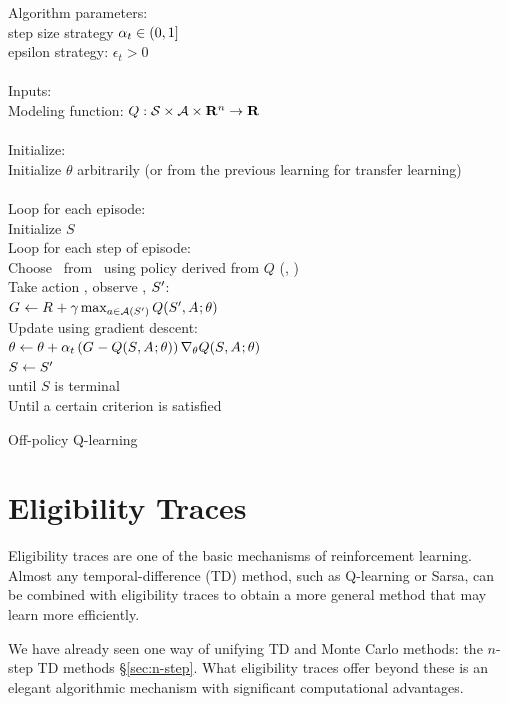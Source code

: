 \begin{table}
\beginalg
Algorithm parameters:\\
\> step size strategy $\alpha_{t} \in (0, 1]$\\
\> epsilon strategy: $\epsilon_t>0$\\
\\
Inputs:\\
\> Modeling function: $Q: \mathcal{S} \times \mathcal{A} \times \mathbf{R}^n \to \mathbf{R}$\\
\\
Initialize:\\
\> Initialize $\theta$ arbitrarily (or from the previous learning for transfer learning)\\
\\
Loop for each episode:\\
\> Initialize $S$\\
\> Loop for each step of episode:\\
\> \> Choose \action{}\ from \state{}\ using policy derived from $Q$ (\eg, \epsgreedy)\\
\> \> Take action \action{}, observe \reward{}, $S_{}'$:\\
\> \> \> $G_{{}} \leftarrow R_{} + \gamma \max_{a\in\mathcal{A}(S')}Q(S_{}',A_{}; \theta)$\\
\> \> Update using gradient descent:\\
\> \> \> $\theta \leftarrow  \theta + \alpha_{t} \left(G_{{}} - Q(S_{}, A_{}; \theta) \right) \nabla_\theta Q(S_{}, A_{}; \theta)$\\
\> \> $S \leftarrow S'$\\
\> until $S$ is terminal\\
Until a certain criterion is satisfied
\endalg
\caption{Off-policy Q-learning}
\label{tab:alg:fcn-approx-q-learning}
\end{table}


\section{Eligibility Traces}



Eligibility traces are one of the basic mechanisms of reinforcement learning.
Almost any temporal-difference (TD) method,
such as Q-learning or Sarsa,
can be combined with eligibility traces to obtain a more general method that may learn more efficiently.

We have already seen one way of unifying TD and Monte Carlo methods:
the $n$-step TD methods \S\ref{sec:n-step}.
What eligibility traces offer beyond these is an elegant algorithmic mechanism
with significant computational advantages.

